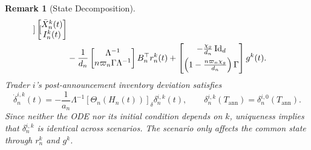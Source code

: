 \documentclass[12pt]{article}
\numberwithin{equation}{section}
\newtheorem{remark}[theorem]{Remark}
\theoremstyle{definition}
\begin{document}
\begin{remark}[State Decomposition]
\begin{align}
\begin{bmatrix}
\end{bmatrix}
\begin{bmatrix}
\bar X_n^k(t)\\
I_n^k(t)
\end{bmatrix}
\notag\\
&-
\frac1{d_n}
\begin{bmatrix}
\Lambda^{-1}\\
n\varpi_n\Gamma\Lambda^{-1}
\end{bmatrix}
B_n^\top r_n^k(t)
+
\begin{bmatrix}
-\frac{\chi_g}{d_n}\operatorname{Id}_d\\[4pt]
\left(1-\frac{n\varpi_n\chi_g}{d_n}\right)\Gamma
\end{bmatrix}
g^k(t).
\label{eq:post_ann_common_subsystem}
\end{align}
Trader \(i\)'s post-announcement inventory deviation satisfies
\begin{equation}\label{eq:post_ann_delta_dynamics}
\dot\delta_n^{i,k}(t)
=
-\frac1{a_n}\Lambda^{-1}
[\Theta_n(H_n(t))]_{\delta}\delta_n^{i,k}(t),
\qquad
\delta_n^{i,k}(T_{\mathrm{ann}})
=\delta_n^{i,0}(T_{\mathrm{ann}}).
\end{equation}
Since neither the ODE nor its initial condition depends on \(k\), uniqueness
implies that \(\delta_n^{i,k}\) is identical across scenarios. The scenario
only affects the common state through \(r_n^k\) and \(g^k\).


\end{remark}
\end{document}
